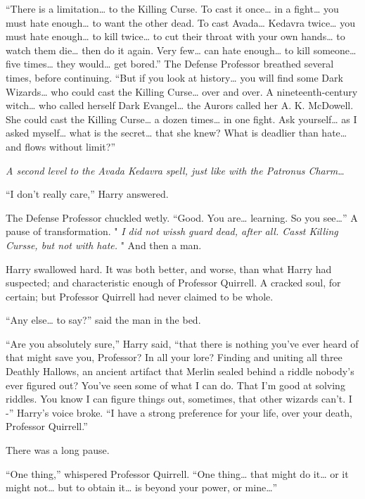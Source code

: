 ``There is a limitation\ldots{} to the Killing Curse. To cast it
once\ldots{} in a fight\ldots{} you must hate enough\ldots{} to want the
other dead. To cast Avada\ldots{} Kedavra twice\ldots{} you must hate
enough\ldots{} to kill twice\ldots{} to cut their throat with your own
hands\ldots{} to watch them die\ldots{} then do it again. Very
few\ldots{} can hate enough\ldots{} to kill someone\ldots{} five
times\ldots{} they would\ldots{} get bored.'' The Defense Professor
breathed several times, before continuing. ``But if you look at
history\ldots{} you will find some Dark Wizards\ldots{} who could cast
the Killing Curse\ldots{} over and over. A nineteenth-century
witch\ldots{} who called herself Dark Evangel\ldots{} the Aurors called
her A. K. McDowell. She could cast the Killing Curse\ldots{} a dozen
times\ldots{} in one fight. Ask yourself\ldots{} as I asked
myself\ldots{} what is the secret\ldots{} that she knew? What is
deadlier than hate\ldots{} and flows without limit?''

\emph{A second level to the Avada Kedavra spell, just like with the
Patronus Charm\ldots{}}

``I don't really care,'' Harry answered.

The Defense Professor chuckled wetly. ``Good. You are\ldots{} learning.
So you see\ldots{}'' A pause of transformation. " \emph{I did not wissh
guard dead, after all. Casst Killing Cursse, but not with hate.} " And
then a man.

Harry swallowed hard. It was both better, and worse, than what Harry had
suspected; and characteristic enough of Professor Quirrell. A cracked
soul, for certain; but Professor Quirrell had never claimed to be whole.

``Any else\ldots{} to say?'' said the man in the bed.

``Are you absolutely sure,'' Harry said, ``that there is nothing you've
ever heard of that might save you, Professor? In all your lore? Finding
and uniting all three Deathly Hallows, an ancient artifact that Merlin
sealed behind a riddle nobody's ever figured out? You've seen some of
what I can do. That I'm good at solving riddles. You know I can figure
things out, sometimes, that other wizards can't. I -'' Harry's voice
broke. ``I have a strong preference for your life, over your death,
Professor Quirrell.''

There was a long pause.

``One thing,'' whispered Professor Quirrell. ``One thing\ldots{} that
might do it\ldots{} or it might not\ldots{} but to obtain it\ldots{} is
beyond your power, or mine\ldots{}''

